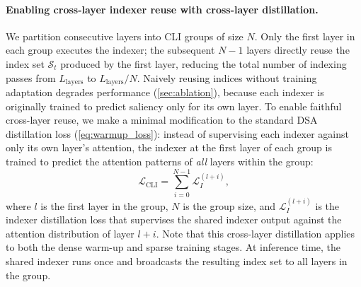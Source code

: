 \documentclass{article}
\begin{document}
\paragraph{Enabling cross-layer indexer reuse with cross-layer distillation.}
We partition consecutive layers into CLI groups of size $N$. Only the first layer in each group executes the indexer; the subsequent $N - 1$ layers directly reuse the index set $\mathcal{S}_t$ produced by the first layer, reducing the total number of indexing passes from $L_{\text{layers}}$ to $L_{\text{layers}} / N$. Naively reusing indices without training adaptation degrades performance (\cref{sec:ablation}), because each indexer is originally trained to predict saliency only for its own layer. To enable faithful cross-layer reuse, we make a minimal modification to the standard DSA distillation loss (\cref{eq:warmup_loss}): instead of supervising each indexer against only its own layer's attention, the indexer at the first layer of each group is trained to predict the attention patterns of \emph{all} layers within the group:
\begin{equation}
\label{eq:cli_loss}
\mathcal{L}_{\text{CLI}} = \sum_{i=0}^{N-1} \mathcal{L}_I^{(l+i)},
\end{equation}
where $l$ is the first layer in the group, $N$ is the group size, and $\mathcal{L}_I^{(l+i)}$ is the indexer distillation loss that supervises the shared indexer output against the attention distribution of layer $l+i$. Note that this cross-layer distillation applies to both the dense warm-up and sparse training stages. At inference time, the shared indexer runs once and broadcasts the resulting index set to all layers in the group.
\end{document}

